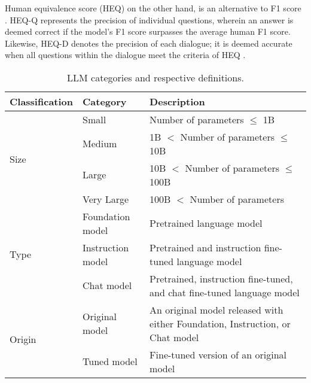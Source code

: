 \documentclass[conference]{IEEEtran}
\begin{document}
Human equivalence score (HEQ) on the other hand, is an alternative to F1 score \cite{huang2018flowqa}. HEQ-Q represents the precision of individual questions, wherein an answer is deemed correct if the model's F1 score surpasses the average human F1 score. Likewise, HEQ-D denotes the precision of each dialogue; it is deemed accurate when all questions within the dialogue meet the criteria of HEQ \cite{choi-etal-2018-quac}.


\begin{table*}[ht]
\centering
\caption{LLM categories and respective definitions.} \label{table:llm_categories}
\begin{tabular}{lll}
\hline
\multicolumn{1}{|l|}{Classification}        & \multicolumn{1}{l|}{Category} & \multicolumn{1}{l|}{Description} \\ \hline
\multicolumn{1}{|l|}{\multirow{4}{*}{Size}} & \multicolumn{1}{l|}{Small}    & \multicolumn{1}{l|}{Number of parameters $\leq$ 1B}            \\ \cline{2-3} 
\multicolumn{1}{|l|}{}                      & \multicolumn{1}{l|}{Medium}   & \multicolumn{1}{l|}{1B $<$ Number of parameters $\leq$ 10B}            \\ \cline{2-3} 
\multicolumn{1}{|l|}{}                      & \multicolumn{1}{l|}{Large}    & \multicolumn{1}{l|}{10B $<$ Number of parameters $\leq$ 100B}            \\ \cline{2-3} 
\multicolumn{1}{|l|}{}                      & \multicolumn{1}{l|}{Very Large} & \multicolumn{1}{l|}{100B $<$ Number of parameters}            \\ \hline
\multicolumn{1}{|l|}{\multirow{3}{*}{Type}} & \multicolumn{1}{l|}{Foundation model}    & \multicolumn{1}{l|}{Pretrained language model}            \\ \cline{2-3} 
\multicolumn{1}{|l|}{}                      & \multicolumn{1}{l|}{Instruction model}   & \multicolumn{1}{l|}{Pretrained and instruction fine-tuned language model}            \\ \cline{2-3} 
\multicolumn{1}{|l|}{}                      & \multicolumn{1}{l|}{Chat model}    & \multicolumn{1}{l|}{Pretrained, instruction fine-tuned, and chat fine-tuned language model}            \\ \hline
\multicolumn{1}{|l|}{\multirow{2}{*}{Origin}} & \multicolumn{1}{l|}{Original model}    & \multicolumn{1}{l|}{An original model released with either Foundation, Instruction, or Chat model}            \\ \cline{2-3}  
\multicolumn{1}{|l|}{}                      & \multicolumn{1}{l|}{Tuned model}    & \multicolumn{1}{l|}{Fine-tuned version of an original model}            \\ \hline

\end{tabular}
\end{table*}
\end{document}

